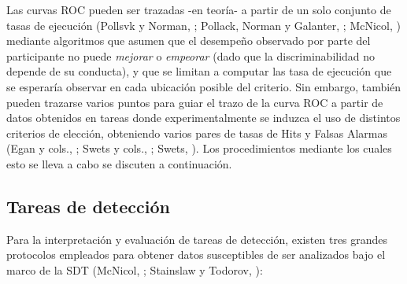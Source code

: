 Las curvas ROC pueden ser trazadas -en teoría- a partir de un solo conjunto de tasas de ejecución (Pollsvk y Norman, \citeyear{Pollack1964a}; Pollack, Norman y Galanter, \citeyear{Pollack1964b}; McNicol, \citeyear{McNicol2}) mediante algoritmos que asumen que el desempeño observado por parte del participante no puede \textit{mejorar} o \textit{empeorar} (dado que la discriminabilidad no depende de su conducta), y que se limitan a computar las tasa de ejecución que se esperaría observar en cada ubicación posible del criterio. Sin embargo, también pueden trazarse varios puntos para guiar el trazo de la curva ROC a partir de datos obtenidos en tareas donde experimentalmente se induzca el uso de distintos criterios de elección, obteniendo varios pares de tasas de Hits y Falsas Alarmas (Egan y cols., \citeyear{Egan1959}; Swets y cols., \citeyear{Swets1961}; Swets, \citeyear{Swets1986}). Los procedimientos mediante los cuales esto se lleva a cabo se discuten a continuación.\\


\subsection{Tareas de detección}

Para la interpretación y evaluación de tareas de detección, existen tres grandes protocolos empleados para obtener datos susceptibles de ser analizados bajo el marco de la SDT (McNicol, \citeyear{McNicol2}; Stainslaw y Todorov, \citeyear{Stainslaw1999}):\\

